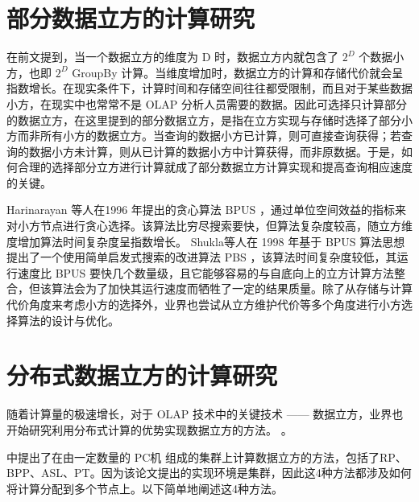 \section{部分数据立方的计算研究}

在前文提到，当一个数据立方的维度为 D 时，数据立方内就包含了 ${2}^{D}$ 个数据小方，也即 ${2}^{D}$ GroupBy  计算。当维度增加时，数据立方的计算和存储代价就会呈指数增长。在现实条件下，计算时间和存储空间往往都受限制，而且对于某些数据小方，在现实中也常常不是 OLAP 分析人员需要的数据。因此可选择只计算部分的数据立方，在这里提到的部分数据立方，是指在立方实现与存储时选择了部分小方而非所有小方的数据立方。当查询的数据小方已计算，则可直接查询获得；若查询的数据小方未计算，则从已计算的数据小方中计算获得，而非原数据。于是，如何合理的选择部分立方进行计算就成了部分数据立方计算实现和提高查询相应速度的关键。

Harinarayan 等人在1996 年提出的贪心算法 BPUS \cite{harinarayan1996implementing} ，通过单位空间效益的指标来对小方节点进行贪心选择。该算法比穷尽搜索要快，但算法复杂度较高，随立方维度增加算法时间复杂度呈指数增长。 Shukla等人在 1998 年基于 BPUS 算法思想提出了一个使用简单启发式搜索的改进算法 PBS \cite{shukla1998materialized} ，该算法时间复杂度较低，其运行速度比 BPUS 要快几个数量级，且它能够容易的与自底向上的立方计算方法整合，但该算法会为了加快其运行速度而牺牲了一定的结果质量。除了从存储与计算代价角度来考虑小方的选择外，业界也尝试从立方维护代价等多个角度进行小方选择算法的设计与优化。

\section{分布式数据立方的计算研究}

随着计算量的极速增长，对于 OLAP 技术中的关键技术 —— 数据立方，业界也开始研究利用分布式计算的优势实现数据立方的方法。\cite{nandi2011distributed} \cite{dehne2006cgmcube} \cite{ng2001iceberg} \cite{lee2012efficient}。

\cite{ng2001iceberg} 中提出了在由一定数量的 PC机 组成的集群上计算数据立方的方法，包括了RP、BPP、ASL、PT。因为该论文提出的实现环境是集群，因此这4种方法都涉及如何将计算分配到多个节点上。以下简单地阐述这4种方法。

